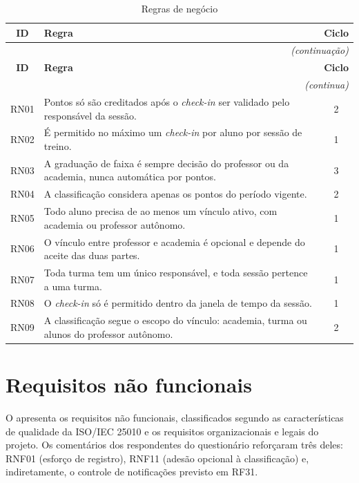 \begin{quadrolongo}
\begin{longtable}{|c|p{11.6cm}|c|}
  \caption{Regras de negócio}\label{qua:rn}\\
  \hline
  \textbf{ID} & \textbf{Regra} & \textbf{Ciclo} \\ \hline
\endfirsthead
  \multicolumn{3}{r}{\textit{(continuação)}}\\
  \hline
  \textbf{ID} & \textbf{Regra} & \textbf{Ciclo} \\ \hline
\endhead
  \multicolumn{3}{r}{\textit{(continua)}}\\
\endfoot
\endlastfoot
    RN01 & Pontos só são creditados após o \textit{check-in} ser validado pelo responsável da sessão. & 2 \\ \hline
    RN02 & É permitido no máximo um \textit{check-in} por aluno por sessão de treino. & 1 \\ \hline
    RN03 & A graduação de faixa é sempre decisão do professor ou da academia, nunca automática por pontos. & 3 \\ \hline
    RN04 & A classificação considera apenas os pontos do período vigente. & 2 \\ \hline
    RN05 & Todo aluno precisa de ao menos um vínculo ativo, com academia ou professor autônomo. & 1 \\ \hline
    RN06 & O vínculo entre professor e academia é opcional e depende do aceite das duas partes. & 1 \\ \hline
    RN07 & Toda turma tem um único responsável, e toda sessão pertence a uma turma. & 1 \\ \hline
    RN08 & O \textit{check-in} só é permitido dentro da janela de tempo da sessão. & 1 \\ \hline
    RN09 & A classificação segue o escopo do vínculo: academia, turma ou alunos do professor autônomo. & 2 \\ \hline
\end{longtable}
\end{quadrolongo}

\section{Requisitos não funcionais}
\label{sec:rnf}

O  apresenta os requisitos não funcionais, classificados
segundo as características de qualidade da ISO/IEC 25010 e os requisitos
organizacionais e legais do projeto. Os comentários dos respondentes do
questionário reforçaram três deles: RNF01 (esforço de registro), RNF11
(adesão opcional à classificação) e, indiretamente, o controle de
notificações previsto em RF31.

